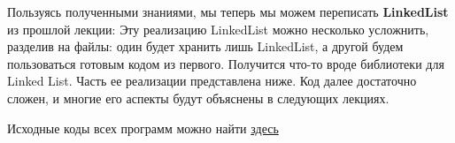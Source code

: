 \begin{lecture}[\lectureSubject]
\begin{lecSection}
	\end{lecSection}
	\begin{lecSection}
		Пользуясь полученными знаниями, мы теперь мы можем переписать \textbf{LinkedList} из прошлой лекции:
		Эту реализацию LinkedList можно несколько усложнить, разделив на файлы: один будет хранить лишь LinkedList, а другой будем пользоваться готовым кодом из первого. Получится что-то вроде библиотеки для Linked List. Часть ее реализации представлена ниже. Код далее достаточно сложен, и многие его аспекты будут объяснены в следующих лекциях.
		\begin{center}
			{Исходные коды всех программ можно найти \href{https://github.com/alekseik1/cpp\_lections\_2017/tree/master/lection\%206}{здесь}}
		\end{center}
	\end{lecSection}
\end{lecture}

\renewcommand{\mainFolder}{/home/aleksei/github_projects/latex_works/informatics/3sem}
\renewcommand{\myFolder}{\mainFolder/lecture_\arabic{lectureNo}/}

\renewcommand{\lectureSubject}{Контейнеры в C++}
%



